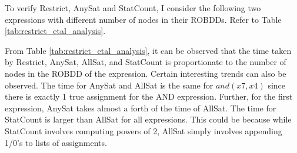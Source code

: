 \documentclass[a4paper, titlepage, 12pt]{article}
\numberwithin{equation}{section}
\begin{document}
\begin{itemize}
                    To verify Restrict, AnySat and StatCount, I consider the following two expressions with different number of nodes in their ROBDDs.
                    Refer to Table \ref{tab:restrict_etal_analysis}.
                    
                    \begin{table}[!tbh]
                        \centering
                        \caption{Time analysis of Restrict, AnySat, AllSat and StatCount.}
                        \label{tab:restrict_etal_analysis}
                    \end{table}

                    From Table \ref{tab:restrict_etal_analysis}, it can be observed that the time taken by Restrict, AnySat, AllSat, and StatCount is proportionate to the number of nodes in the ROBDD of the expression.
                    Certain interesting trends can also be observed.
                    The time for AnySat and AllSat is the same for $and(x7, x4)$ since there is exactly 1 true assignment for the AND expression.
                    Further, for the first expression, AnySat takes almost a forth of the time of AllSat.
                    The time for StatCount is larger than AllSat for all expressions.
                    This could be because while StatCount involves computing powers of 2, AllSat simply involves appending 1/0's to lists of assignments.

            \end{itemize}
        
\end{document}
